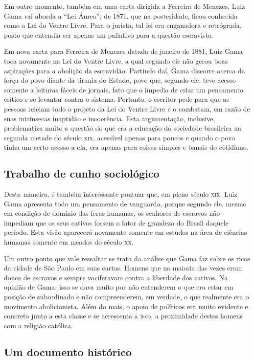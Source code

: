 \documentclass[12pt]{extarticle}
\begin{document}
Em outro momento, também em uma carta dirigida a Ferreira de Menezes,
Luiz Gama vai aborda a ``Lei Áurea'', de 1871, que na posteridade, ficou
conhecida como a Lei do Ventre Livre. Para o jurista, tal lei era
enganadora e retrógrada, posto que entendia ser apenas um paliativo para
a questão escravista.

Em nova carta para Ferreira de Menezes datada de janeiro de 1881, Luiz
Gama toca novamente na Lei do Ventre Livre, a qual segundo ele não gerou
boas aspirações para a abolição da escravidão. Partindo daí, Gama
discorre acerca da força do povo diante da tirania do Estado, povo que,
segundo ele, teve acesso somente a leituras fáceis de jornais, fato que
o impedia de criar um pensamento crítico e se levantar contra o sistema.
Portanto, o escritor pede para que as pessoas releiam todo o projeto da
Lei do Ventre Livre e o combatam, em razão de suas intrínsecas inaptidão
e incoerência. Esta argumentação, inclusive, problematiza muito a
questão do que era a educação da sociedade brasileira na segunda metade
do século \textsc{xix}, acessível apenas para poucos e quando o povo tinha um
certo acesso a ela, era apenas para coisas simples e banais do
cotidiano.

\subsection{Trabalho de cunho sociológico}

Desta maneira, é também interessante pontuar que, em pleno século \textsc{xix},
Luiz Gama apresenta todo um pensamento de vanguarda, porque segundo ele,
mesmo em condição de domínio das feras humanas, os senhores de escravos
não impediam que os seus cativos fossem o fator de grandeza do Brasil
daquele período. Esta visão aparecerá novamente somente em estudos na
área de ciências humanas somente em meados do século \textsc{xx}.

Um outro ponto que vale ressaltar se trata da análise que Gama faz sobre
os ricos da cidade de São Paulo em suas cartas. Homens que na maioria
das vezes eram donos de escravos e sempre vociferavam contra a liberdade
dos cativos. Na opinião de Gama, isso se dava muito por não entenderem o
que era estar em posição de subordinado e não compreenderem, em verdade,
o que realmente era o movimento abolicionista. Além do mais, o apoio de
políticos era muito evidente e concreto junto a esta classe e se
acrescenta a isso, a proximidade destes homens com a religião católica.

\subsection{Um documento histórico}
\end{document}
